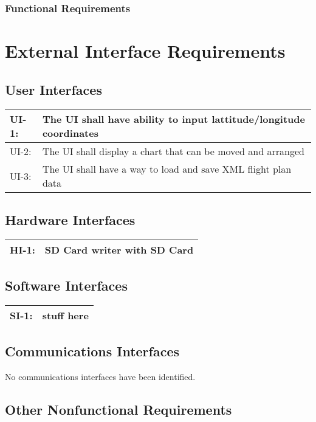 \documentclass[12pt, letterpaper]{article}
\begin{document}
          \subsubsection{Functional Requirements}

\section{External Interface Requirements}
  \subsection{User Interfaces}
    \begin{tabularx}{\textwidth}{|l|X|}
      \hline
      UI-1: & The UI shall have ability to input lattitude/longitude coordinates\\ \hline
      UI-2: & The UI shall display a chart that can be moved and arranged\\ \hline
      UI-3: & The UI shall have a way to load and save XML flight plan data\\ \hline
    \end{tabularx}
  \subsection{Hardware Interfaces}
    \begin{tabularx}{\textwidth}{|l|X|}
      \hline
      HI-1: & SD Card writer with SD Card\\
      \hline
    \end{tabularx}

  \subsection{Software Interfaces}
    \begin{tabularx}{\textwidth}{|l|X|}
      \hline
      SI-1: & stuff here \\
      \hline
    \end{tabularx}

  \subsection{Communications Interfaces}
  No communications interfaces have been identified.

\subsection{Other Nonfunctional Requirements}
\end{document}
